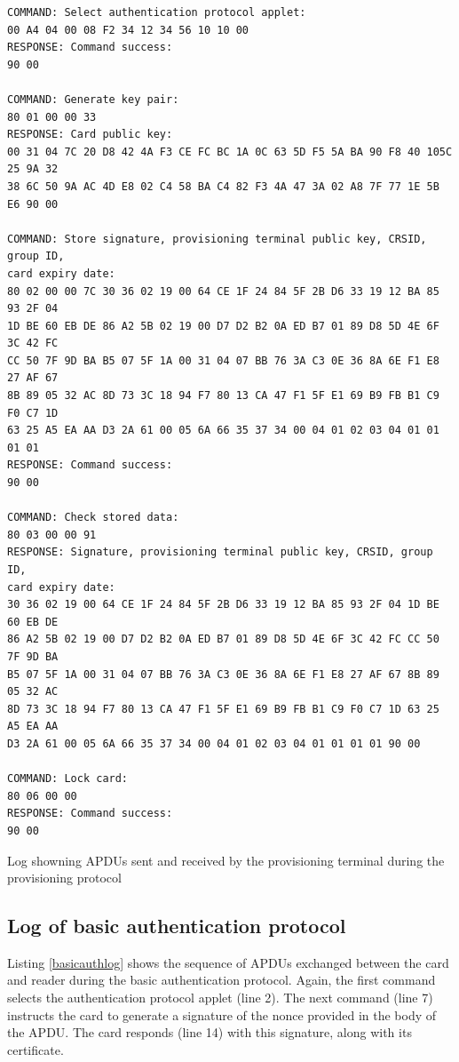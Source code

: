 \documentclass[12pt,a4paper,twoside,openright]{report}
\begin{document}
\begin{listing}
\begin{verbatim}
COMMAND: Select authentication protocol applet:
00 A4 04 00 08 F2 34 12 34 56 10 10 00
RESPONSE: Command success:
90 00

COMMAND: Generate key pair:
80 01 00 00 33
RESPONSE: Card public key:
00 31 04 7C 20 D8 42 4A F3 CE FC BC 1A 0C 63 5D F5 5A BA 90 F8 40 105C 25 9A 32
38 6C 50 9A AC 4D E8 02 C4 58 BA C4 82 F3 4A 47 3A 02 A8 7F 77 1E 5B E6 90 00

COMMAND: Store signature, provisioning terminal public key, CRSID, group ID,
card expiry date:
80 02 00 00 7C 30 36 02 19 00 64 CE 1F 24 84 5F 2B D6 33 19 12 BA 85 93 2F 04
1D BE 60 EB DE 86 A2 5B 02 19 00 D7 D2 B2 0A ED B7 01 89 D8 5D 4E 6F 3C 42 FC
CC 50 7F 9D BA B5 07 5F 1A 00 31 04 07 BB 76 3A C3 0E 36 8A 6E F1 E8 27 AF 67
8B 89 05 32 AC 8D 73 3C 18 94 F7 80 13 CA 47 F1 5F E1 69 B9 FB B1 C9 F0 C7 1D
63 25 A5 EA AA D3 2A 61 00 05 6A 66 35 37 34 00 04 01 02 03 04 01 01 01 01
RESPONSE: Command success:
90 00

COMMAND: Check stored data:
80 03 00 00 91
RESPONSE: Signature, provisioning terminal public key, CRSID, group ID,
card expiry date:
30 36 02 19 00 64 CE 1F 24 84 5F 2B D6 33 19 12 BA 85 93 2F 04 1D BE 60 EB DE
86 A2 5B 02 19 00 D7 D2 B2 0A ED B7 01 89 D8 5D 4E 6F 3C 42 FC CC 50 7F 9D BA
B5 07 5F 1A 00 31 04 07 BB 76 3A C3 0E 36 8A 6E F1 E8 27 AF 67 8B 89 05 32 AC
8D 73 3C 18 94 F7 80 13 CA 47 F1 5F E1 69 B9 FB B1 C9 F0 C7 1D 63 25 A5 EA AA
D3 2A 61 00 05 6A 66 35 37 34 00 04 01 02 03 04 01 01 01 01 90 00

COMMAND: Lock card:
80 06 00 00
RESPONSE: Command success:
90 00
\end{verbatim}
\caption{Log showning APDUs sent and received by the provisioning terminal during the provisioning protocol}
\label{provisionlog}
\end{listing}

\subsection{Log of basic authentication protocol}

Listing \autoref{basicauthlog} shows the sequence of APDUs exchanged between the card and reader during the basic authentication protocol. Again, the first command selects the authentication protocol applet (line 2). The next command (line 7) instructs the card to generate a signature of the nonce provided in the body of the APDU. The card responds (line 14) with this signature, along with its certificate.
\end{document}
